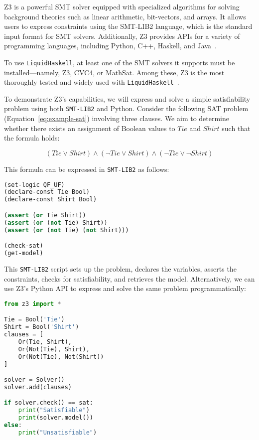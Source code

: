 \documentclass[]{rptuseminar}
\begin{document}
Z3 is a powerful SMT solver equipped with specialized algorithms for solving background theories such as linear arithmetic, bit-vectors, and arrays. It allows users to express constraints using the SMT-LIB2 language, which is the standard input format for SMT solvers. Additionally, Z3 provides APIs for a variety of programming languages, including Python, C++, Haskell, and Java~\cite{nikolaj_bjorner_programming_nodate}.

To use \texttt{LiquidHaskell}, at least one of the SMT solvers it supports must be installed—namely, Z3, CVC4, or MathSat. Among these, Z3 is the most thoroughly tested and widely used with \texttt{LiquidHaskell}~\cite{jhala_programming_2020}.

To demonstrate Z3's capabilities, we will express and solve a simple satisfiability problem using both \texttt{SMT-LIB2} and Python.
Consider the following SAT problem (Equation~\ref{eq:example-sat}) involving three clauses.  
We aim to determine whether there exists an assignment of Boolean values to \( \mathit{Tie} \) and \( \mathit{Shirt} \) such that the formula holds:

\vspace{1em}
\begin{equation}
  \label{eq:example-sat}
  (\mathit{Tie} \lor \mathit{Shirt}) \land (\lnot \mathit{Tie} \lor \mathit{Shirt}) \land (\lnot \mathit{Tie} \lor \lnot \mathit{Shirt})
\end{equation}

This formula can be expressed in \texttt{SMT-LIB2} as follows:

\begin{lstlisting}[language=lisp, label={lst:smtlib2}]
(set-logic QF_UF)
(declare-const Tie Bool)
(declare-const Shirt Bool)

(assert (or Tie Shirt))
(assert (or (not Tie) Shirt))
(assert (or (not Tie) (not Shirt)))

(check-sat)
(get-model)
\end{lstlisting}

\vspace{1em}

This \texttt{SMT-LIB2} script sets up the problem, declares the variables, asserts the constraints, checks for satisfiability, 
and retrieves the model.
Alternatively, we can use Z3’s Python API to express and solve the same problem programmatically:

\begin{lstlisting}[language=Python, label={lst:z3python}]
from z3 import *

Tie = Bool('Tie')
Shirt = Bool('Shirt')
clauses = [
    Or(Tie, Shirt),
    Or(Not(Tie), Shirt),
    Or(Not(Tie), Not(Shirt))
]

solver = Solver()
solver.add(clauses)

if solver.check() == sat:
    print("Satisfiable")
    print(solver.model())
else:
    print("Unsatisfiable")
\end{lstlisting}
\end{document}
